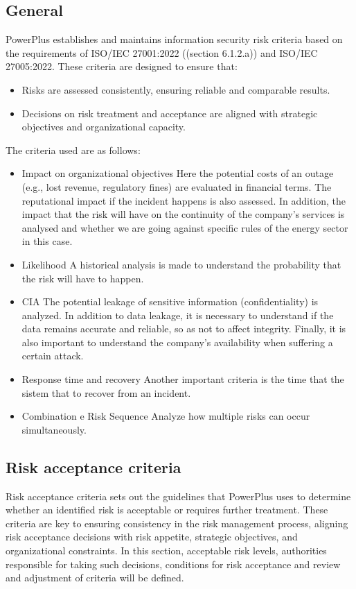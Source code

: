 \subsection{General}
PowerPlus establishes and maintains information security risk criteria based on the requirements of ISO/IEC 27001:2022 ((section 6.1.2.a)) and ISO/IEC 27005:2022. These criteria are designed to ensure that:
\begin{itemize}
    \item Risks are assessed consistently, ensuring reliable and comparable results.
    \item Decisions on risk treatment and acceptance are aligned with strategic objectives and organizational capacity.
\end{itemize}
The criteria used are as follows:
\begin{itemize}
    \item Impact on organizational objectives \- Here the potential costs of an outage (e.g., lost revenue, regulatory fines) are evaluated in financial terms. The reputational impact if the incident happens is also assessed.  In addition, the impact that the risk will have on the continuity of the company's services is analysed and whether we are going against specific rules of the energy sector in this case.
    \item Likelihood \- A historical analysis is made to understand the probability that the risk will have to happen.
    \item CIA \- The potential leakage of sensitive information (confidentiality) is analyzed. In addition to data leakage, it is necessary to understand if the data remains accurate and reliable, so as not to affect integrity. Finally, it is also important to understand the company's availability when suffering a certain attack.
    \item Response time and recovery \- Another important criteria is the time that the sistem that to recover from an incident.
    \item Combination e Risk Sequence \- Analyze how multiple risks can occur simultaneously.
\end{itemize}

\subsection{Risk acceptance criteria}

Risk acceptance criteria sets out the guidelines that PowerPlus uses to determine whether an identified risk is acceptable or requires further treatment. These criteria are key to ensuring consistency in the risk management process, aligning risk acceptance decisions with risk appetite, strategic objectives, and organizational constraints.
In this section, acceptable risk levels, authorities responsible for taking such decisions, conditions for risk acceptance and review and adjustment of criteria will be defined. 

